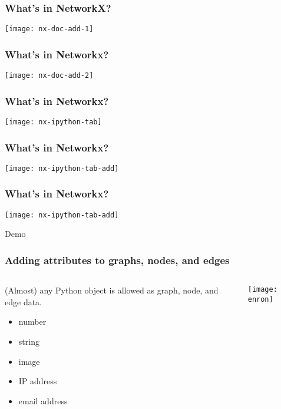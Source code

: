 \documentclass[xcolor=dvipsnames, 9pt]{beamer}
\begin{document}
\begin{frame}
\frametitle{What's in NetworkX?}
\centerline{\texttt{[image: nx-doc-add-1]}}
\end{frame}

\begin{frame}
\frametitle{What's in Networkx?}
\centerline{\texttt{[image: nx-doc-add-2]}}
\end{frame}

\begin{frame}
\frametitle{What's in Networkx?}
\centerline{\texttt{[image: nx-ipython-tab]}}
\end{frame}

\begin{frame}
\frametitle{What's in Networkx?}
\centerline{\texttt{[image: nx-ipython-tab-add]}}
\end{frame}


\begin{frame}
\frametitle{What's in Networkx?}
\centerline{\texttt{[image: nx-ipython-tab-add]}}
Demo
\end{frame}



\begin{frame}[fragile]
\frametitle{Adding attributes to graphs, nodes, and edges}

\begin{columns}
\begin{column}{0.3\textwidth}

(Almost) any Python object is allowed as graph, node, and edge data. 
\begin{itemize}
\item number
\item string
\item image
\item IP address
\item email address
\end{itemize}
\end{column}

\begin{column}{0.7\textwidth}
\centerline{\texttt{[image: enron]}}
\end{column}

\end{columns}


\end{frame}
\end{document}
